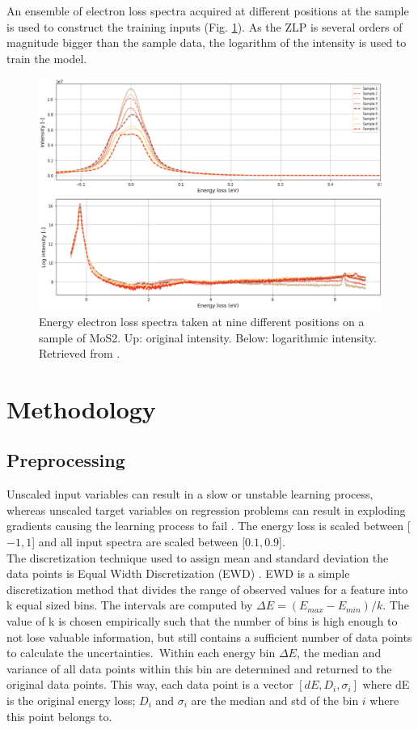 \documentclass[11pt,a4paper]{article}
\numberwithin{equation}{section}
\numberwithin{figure}{section}
\numberwithin{table}{section}
\begin{document}
An ensemble of electron loss spectra acquired at different positions at the sample is used to construct the training inputs (Fig. \ref{spectra}). As the ZLP is several orders of magnitude bigger than the sample data, the logarithm of the intensity is used to train the model.

\begin{figure}[H]
    \centering
    \includegraphics[width=130mm]{plots/spectrum.png}
    \caption{Energy electron loss spectra taken at nine different positions on a sample of MoS2. Up: original intensity. Below: logarithmic intensity. Retrieved from \cite{soniamos2}. }
    \label{spectra}
\end{figure}


\section{Methodology}

\subsection{Preprocessing}
Unscaled input variables can result in a slow or unstable learning process, whereas unscaled target variables on regression problems can result in exploding gradients causing the learning process to fail \cite{juan}. The energy loss is scaled between [$-1,1$] and all input spectra are scaled between [$0.1, 0.9$]. \\

The discretization technique used to assign mean and standard deviation the data points is Equal Width Discretization (EWD) \cite{ewd}. EWD is a simple discretization method that divides the range of observed values for a feature into k equal sized bins. The intervals are computed by 
 $\Delta E = (E_{max} - E_{min}) / k$. The value of k is chosen empirically such that the number of bins is high enough to not lose valuable information, but still contains a sufficient number of data points to calculate the uncertainties.\
Within each energy bin $\Delta E$, the median and variance of all data points within this bin are determined and returned to the original data points. This way, each data point is a vector $[dE, D_i, \sigma_i]$ where dE is the original energy loss; $D_i$ and $\sigma_i$ are the median and std of the bin $i$ where this point belongs to. \\
\end{document}
